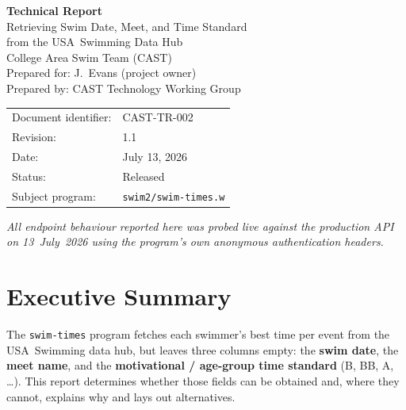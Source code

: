 \documentclass[12pt]{article}
\newcommand{\code}[1]{\texttt{#1}}
\begin{document}
\begin{titlepage}
  \centering
  \vspace*{2cm}
  {\Huge\bfseries\color{castblue} Technical Report\\[0.5em]}
  {\Large Retrieving Swim Date, Meet, and Time Standard\\[0.3em]
   from the USA~Swimming Data Hub}\\[2em]
  {\large College Area Swim Team (CAST)}\\[0.5em]
  {\normalsize Prepared for: J.~Evans (project owner)}\\[0.5em]
  {\normalsize Prepared by: CAST Technology Working Group}\\[2em]
  \begin{tabular}{ll}
    Document identifier: & CAST-TR-002                                 \\
    Revision:            & 1.1                                         \\
    Date:                & July 13, 2026                               \\
    Status:              & Released                                    \\
    Subject program:     & \code{swim2/swim-times.w}                    \\
  \end{tabular}
  \vfill
  {\small\textit{All endpoint behaviour reported here was probed live against
  the production API on 13~July~2026 using the program's own anonymous
  authentication headers.}}
\end{titlepage}

\tableofcontents
\clearpage

\section{Executive Summary}

The \code{swim-times} program fetches each swimmer's best time per event
from the USA~Swimming data hub, but leaves three columns empty: the
\textbf{swim date}, the \textbf{meet name}, and the \textbf{motivational /
age-group time standard} (B, BB, A, \dots). This report determines whether
those fields can be obtained and, where they cannot, explains why and lays
out alternatives.
\end{document}

